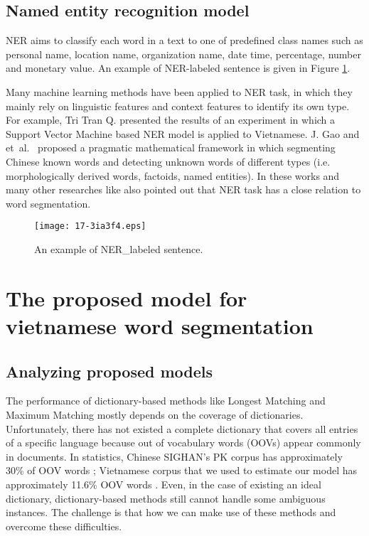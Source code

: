 \documentclass[english]{jnlp_1.4}
\begin{document}
\subsection{Named entity recognition model}

NER aims to classify each word in a text to one of
predefined class names such as personal name, location name,
organization name, date time,  percentage, number and monetary
value. An example of NER-labeled sentence is given in Figure \ref{f10}.

Many machine learning methods have been applied to NER task, in which they mainly rely on linguistic
features and context features to identify its own type. For example, Tri Tran Q.
\cite{Tri07} presented the results of an experiment in which a Support Vector Machine based NER model
is applied to Vietnamese. J. Gao and et~al.\ \cite{Gao05} proposed a pragmatic mathematical framework
in which segmenting Chinese known words and detecting unknown words of different types (i.e.
morphologically derived words, factoids, named entities). In these works and many other researches
like \cite{CamTu07} also pointed out that NER task has a close relation to word segmentation.

\begin{figure}[t]
\begin{center}
\texttt{[image: 17-3ia3f4.eps]}
\caption{An example of NER\_labeled sentence.}
\label{f10}
\end{center}
\end{figure}



\section{The proposed model for vietnamese word segmentation}

\subsection{Analyzing proposed models}

The performance of dictionary-based methods like Longest Matching and Maximum Matching mostly depends on
the coverage of dictionaries. Unfortunately, there has not existed a complete dictionary that covers all entries
of a specific language because out of vocabulary words (OOVs) appear commonly in documents.
In statistics, Chinese SIGHAN's PK corpus has approximately 30\% of OOV words \cite{Gao05};
Vietnamese corpus that we used to estimate our model has approximately 11.6\% OOV words \cite{CamTu07}.
Even, in the case of existing an ideal dictionary, dictionary-based methods still cannot handle some ambiguous instances.
The challenge is that how we can make use of these methods and overcome these difficulties.
\end{document}
